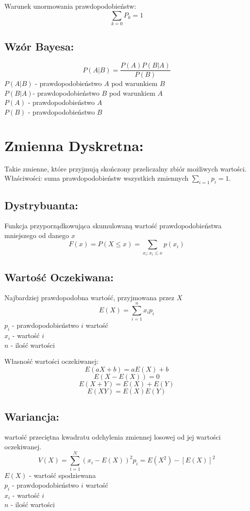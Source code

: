 \documentclass[fleqn,a4paper]{article}
\begin{document}
Warunek unormowania prawdopodobieństw:
\[\sum_{k=0}{P_k}=1\]

\subsection{Wzór Bayesa:}
\[P(A|B) = \frac{P(A)P(B|A)}{P(B)}\]
$P(A|B)$ - prawdopodobieństwo $A$ pod warunkiem $B$\\
$P(B|A)$- prawdopodobieństwo $B$ pod warunkiem $A$\\
$P(A)$ - prawdopodobieństwo $A$\\
$P(B)$ - prawdopodobieństwo $B$

\pagebreak

\section{Zmienna Dyskretna:}
Takie zmienne, które przyjmują skończony przeliczalny zbiór możliwych wartości.
Właściwości: suma prawdopodobieństw wszystkich zmiennych \(\sum_{i=1}{p_i}=1\).
\subsection{Dystrybuanta:}
Funkcja przyporządkowująca skumulowaną wartość prawdopodobieństwa mniejszego od danego $x$
\[F(x)=P(X \leq x)=\sum_{x_i:x_i \leq x}p(x_i)\]
\subsection{Wartość Oczekiwana:}
Najbardziej prawdopodobna wartość, przyjmowana przez $X$
\[E(X) = \sum_{i=1}^nx_ip_i\]
$p_i$ - prawdopodobieństwo $i$ wartość\\
$x_i$ - wartość $i$\\
$n$   - ilość wartości

Własność wartości oczekiwanej:
\[E(aX+b)=aE(X)+b\]
\[E(X-E(X))=0\]
\[E(X+Y)=E(X)+E(Y)\]
\[E(XY)=E(X)E(Y)\]

\subsection{Wariancja:}
wartość przeciętna kwadratu odchylenia zmiennej losowej od jej wartości oczekiwanej.
\[V(X) = \sum_{i=1}^N(x_i-E(X))^2p_i = E(X^2) - [E(X)]^2\]
$E(X)$ - wartość spodziewana\\
$p_i$ - prawdopodobieństwo $i$ wartość\\
$x_i$ - wartość $i$\\
$n$   - ilość wartości
\end{document}
